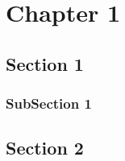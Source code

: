 \chapter{Chapter 1}
\section{Section 1}
\begin{theorem}
    \label{th:logicalgebra}
    \lipsum[1]
\end{theorem}

\begin{definition}
    \label{th:rationalcauchysequence}
    \lipsum[1]
\end{definition}

\begin{note}
    \lipsum[1]
\end{note}

\begin{example}[Solving the equation $x^2 = 2$]
    \lipsum[1]
\end{example}

\begin{problem}
    \lipsum[1]\newline
    \begin{solution}
        \lipsum[1]
    \end{solution}
\end{problem}

\subsection{SubSection 1}
\lipsum[1]

\section{Section 2}
\begin{theorem}
    \lipsum[1]
\end{theorem}

\begin{definition}
    \lipsum[1]
\end{definition}

\begin{note}
    \lipsum[1]
\end{note}

\begin{example}
    \lipsum[1]
\end{example}

